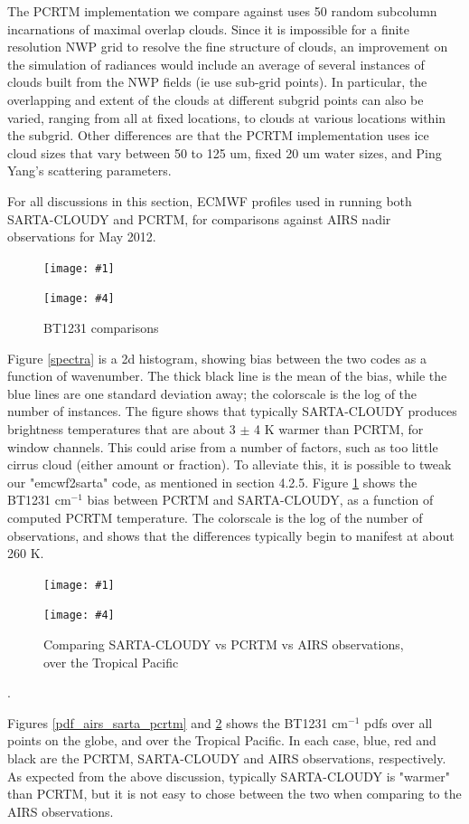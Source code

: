 \documentclass[11pt]{article}
\newcommand{\sasc}{\textsf{SARTA-CLOUDY}\xspace}
\newcommand{\pcrtm}{\textsf{PCRTM}\xspace}
\newcommand{\dfigure}[6]
{
\begin{figure}
  \begin{minipage}[t]{0.45\textwidth}
  \centering
  \texttt{[image: \#1]}
   \caption{#2}  \label{#3}
  \end{minipage}
  \hfil
  \begin{minipage}[t]{0.45\linewidth}
  \centering
  \texttt{[image: \#4]}
   \caption{#5}  \label{#6}
  \end{minipage}
\end{figure}
}
\newcommand{\wn}{cm$^{-1}$\xspace}
\begin{document}
The \pcrtm implementation we compare against uses 50 random subcolumn incarnations of maximal overlap clouds. Since it
is impossible for a finite resolution NWP grid to resolve the fine structure of clouds, an improvement on the simulation
of radiances would include an average of several instances of clouds built from the NWP fields (ie use sub-grid
points). In particular, the overlapping and extent of the clouds at different subgrid points can also be varied, ranging from 
all at fixed locations, to clouds at various locations within the subgrid. 
Other differences are that the \pcrtm implementation uses ice cloud sizes that vary between 50 to 125 um, fixed 20 um 
water sizes, and Ping Yang's scattering parameters. 

For all discussions in this section, ECMWF profiles used in running both \sasc and \pcrtm, for comparisons
against AIRS nadir observations for May 2012.

\dfigure{Figs/spectra_sartaVSpcrtm.jpg}{Comparing \sasc vs \pcrtm}{spectra}{Figs/pcrtm_calc_vs_sarta_biasV1}{BT1231 comparisons}{bt1231_sarta_pcrtm}

Figure \ref{spectra} is a 2d histogram, showing bias between the two codes as a function of wavenumber. The thick 
black line is the mean of the bias, while the blue lines are one standard deviation away; the colorscale is the 
log of the number of instances. The figure shows that typically \sasc produces brightness temperatures that are about 
3 $\pm$ 4 K warmer than \pcrtm, for window channels. This could arise from a number of factors, such as too 
little cirrus cloud (either amount or fraction). To alleviate this, it is possible to tweak our 
"emcwf2sarta" code, as mentioned in section 4.2.5. Figure \ref{bt1231_sarta_pcrtm} shows the BT1231 \wn bias between
\pcrtm and \sasc, as a function of computed \pcrtm temperature. The colorscale is the log of the number of
observations, and shows that the differences typically begin to manifest at about 260 K.

\dfigure{Figs/pcrtm_vs_sarta_vs_obs_pdf1231_allregions_2.jpg}{Comparing \sasc vs \pcrtm vs AIRS observations, over all the globe}{pdf_airs_sarta_pcrtm}{Figs/pcrtm_vs_sarta_vs_obs_pdf1231_pacific_2.jpg}{Comparing \sasc vs \pcrtm vs AIRS observations, over the Tropical Pacific}{pdf_airs_sarta_pcrtm_tropical_pacific}. 

Figures \ref{pdf_airs_sarta_pcrtm} and \ref{pdf_airs_sarta_pcrtm_tropical_pacific} shows 
the BT1231 \wn pdfs over all points on the globe, and over the Tropical Pacific. In each case, blue, red 
and black are the \pcrtm, \sasc and AIRS observations, respectively. As expected from the above discussion,
typically \sasc is "warmer" than \pcrtm, but it is not easy to chose between the two when comparing to the 
AIRS observations.
\end{document}
